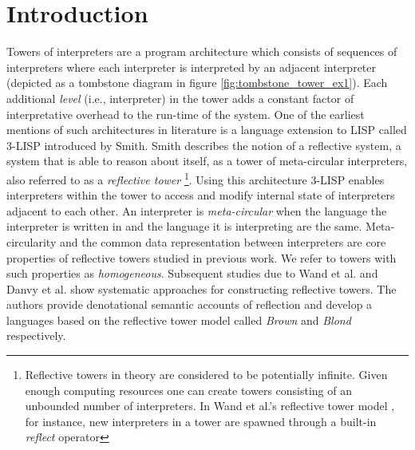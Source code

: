 \documentclass[a4paper,12pt,twoside,openright]{report}
\theoremstyle{definition}
\begin{document}
\section{Introduction}
Towers of interpreters are a program architecture which consists of sequences of interpreters where each interpreter is interpreted by an adjacent interpreter (depicted as a tombstone diagram in figure \ref{fig:tombstone_tower_ex1}). Each additional \textit{level} (i.e., interpreter) in the tower adds a constant factor of interpretative overhead to the run-time of the system. One of the earliest mentions of such architectures in literature is a language extension to LISP called 3-LISP \cite{smith1984reflection} introduced by Smith. Smith describes the notion of a reflective system, a system that is able to reason about itself, as a tower of meta-circular interpreters, also referred to as a \textit{reflective tower} \footnote{Reflective towers in theory  are considered to be potentially infinite. Given enough computing resources one can create towers consisting of an unbounded number of interpreters. In Wand et al.'s reflective tower model \cite{wand1988mystery}, for instance, new interpreters in a tower are spawned through a built-in \textit{reflect} operator}. Using this architecture 3-LISP enables interpreters within the tower to access and modify internal state of interpreters adjacent to each other. An interpreter is \textit{meta-circular} when the language the interpreter is written in and the language it is interpreting are the same. Meta-circularity and the common data representation between interpreters are core properties of reflective towers studied in previous work. We refer to towers with such properties as \textit{homogeneous}. Subsequent studies due to Wand et al. \cite{wand1988mystery} and Danvy et al. \cite{danvy1988intensions} show systematic approaches for constructing reflective towers. The authors provide denotational semantic accounts of reflection and develop a languages based on the reflective tower model called \textit{Brown} and \textit{Blond} respectively.
\end{document}
